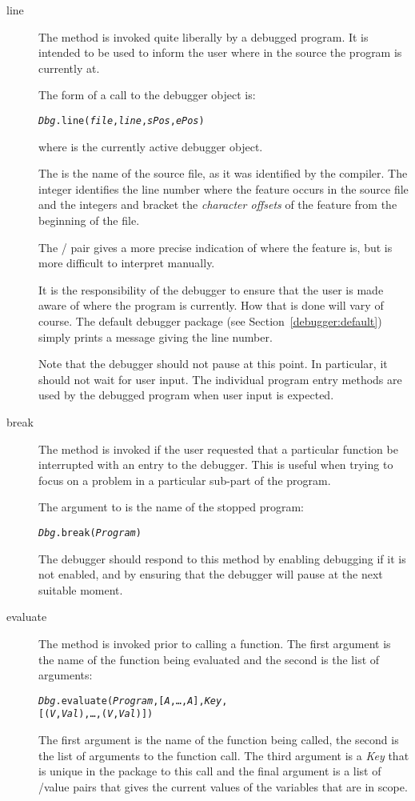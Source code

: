 \begin{description}
\item[line]
The  method is invoked quite liberally by a debugged program. It is intended to be used to inform the user where in the source the program is currently at.

The form of a  call to the debugger object is:
\begin{alltt}
\emph{Dbg}.line(\emph{file},\emph{line},\emph{sPos},\emph{ePos})
\end{alltt}
where  is the currently active debugger object.

The  is the name of the source file, as it was identified by the compiler. The integer  identifies the line number where the feature occurs in the source file and the integers  and  bracket the \emph{character offsets} of the feature from the beginning of the file.

The / pair gives a more precise indication of where the feature is, but is more difficult to interpret manually.

It is the responsibility of the debugger to ensure that the user is made aware of where the program is currently. How that is done will vary of course. The default debugger package (see Section~\vref{debugger:default}) simply prints a message giving the line number.

Note that the debugger should not pause at this point. In particular, it should not wait for user input. The individual program entry methods are used by the debugged program when user input is expected.

\item[break]
The  method is invoked if the user requested that a particular function be interrupted with an entry to the debugger. This is useful when trying to focus on a problem in a particular sub-part of the program.

The argument to  is the name of the stopped program:
\begin{alltt}
\emph{Dbg}.break(\emph{Program})
\end{alltt}

The debugger should respond to this method by enabling debugging if it is not enabled, and by ensuring that the debugger will pause at the next suitable moment.

\item[evaluate]
The  method is invoked prior to calling a function. The first argument is the name of the function being evaluated and the second is the list of arguments:
\begin{alltt}
\emph{Dbg}.evaluate(\emph{Program},[\emph{A},\ldots,\emph{A\subn}],\emph{Key},
              [(\emph{V},\emph{Val}),\ldots,(\emph{V\subn},\emph{Val\subn})])
\end{alltt}
The first argument is the name of the function being called, the second is the list of arguments to the function call. The third argument is a \emph{Key} that is unique in the package to this call and the final argument is a list of /value pairs that gives the current values of the variables that are in scope.


\end{description}
